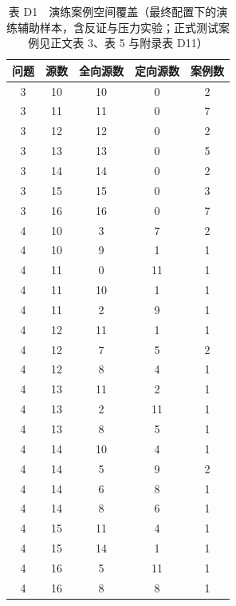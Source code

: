 
\begin{table}[htbp]
\centering
\caption*{表 D1　演练案例空间覆盖（最终配置下的演练辅助样本，含反证与压力实验；正式测试案例见正文表 3、表 5 与附录表 D11）}
{\begin{tabular}{c c c c c}
\toprule
问题 & 源数 & 全向源数 & 定向源数 & 案例数 \\
\midrule
\midrule
3 & 10 & 10 & 0 & 2 \\
3 & 11 & 11 & 0 & 7 \\
3 & 12 & 12 & 0 & 2 \\
3 & 13 & 13 & 0 & 5 \\
3 & 14 & 14 & 0 & 2 \\
3 & 15 & 15 & 0 & 3 \\
3 & 16 & 16 & 0 & 7 \\
4 & 10 & 3 & 7 & 2 \\
4 & 10 & 9 & 1 & 1 \\
4 & 11 & 0 & 11 & 1 \\
4 & 11 & 10 & 1 & 1 \\
4 & 11 & 2 & 9 & 1 \\
4 & 12 & 11 & 1 & 1 \\
4 & 12 & 7 & 5 & 2 \\
4 & 12 & 8 & 4 & 1 \\
4 & 13 & 11 & 2 & 1 \\
4 & 13 & 2 & 11 & 1 \\
4 & 13 & 8 & 5 & 1 \\
4 & 14 & 10 & 4 & 1 \\
4 & 14 & 5 & 9 & 2 \\
4 & 14 & 6 & 8 & 1 \\
4 & 14 & 8 & 6 & 1 \\
4 & 15 & 11 & 4 & 1 \\
4 & 15 & 14 & 1 & 1 \\
4 & 16 & 5 & 11 & 1 \\
4 & 16 & 8 & 8 & 1 \\
\bottomrule
\end{tabular}}
\end{table}

